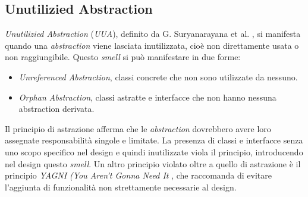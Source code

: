 \subsection{Unutilizied Abstraction}
    \textit{Unutilizied Abstraction} (\textit{UUA}), definito da G. Suryanarayana et al. \cite{SURYANARAYANA201521}, si manifesta quando una \textit{abstraction} viene lasciata inutilizzata, cioè non direttamente usata o non raggiungibile. Questo \textit{smell} si può manifestare in due forme: 
        \begin{itemize}
        \item \textit{Unreferenced Abstraction}, classi concrete che non sono utilizzate da nessuno.
        
        \item \textit{Orphan Abstraction}, classi astratte e interfacce che non hanno nessuna abstraction derivata.
    \end{itemize}
    Il principio di astrazione afferma che le \textit{abstraction} dovrebbero avere loro assegnate responsabilità singole e limitate. La presenza di classi e interfacce senza uno scopo specifico nel design e quindi inutilizzate viola il principio, introducendo nel design questo \textit{smell}. Un altro principio violato oltre a quello di astrazione è il principio \textit{YAGNI (You Aren't Gonna Need It} \cite{yagniFowler}, che raccomanda di evitare l'aggiunta di funzionalità non strettamente necessarie al design.

